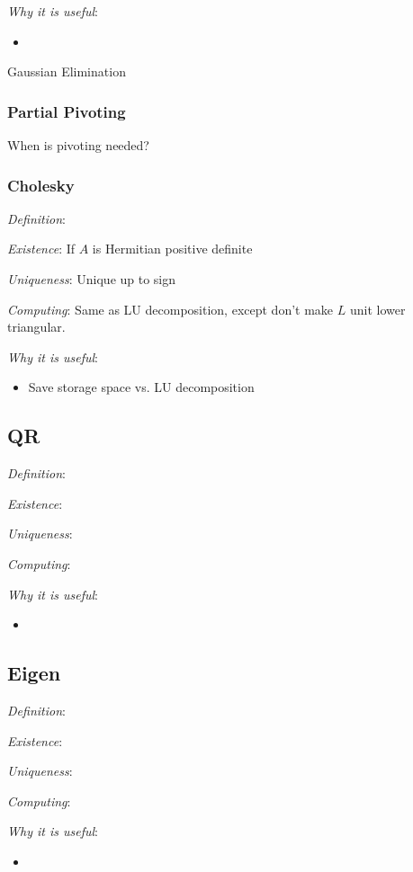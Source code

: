 \documentclass[12pt]{article}
\begin{document}
\textit{Why it is useful}:
\begin{itemize}[nolistsep]
    \item 
\end{itemize}

Gaussian Elimination 

\subsubsection{Partial Pivoting}

When is pivoting needed?

\subsubsection{Cholesky}
\label{sec:cholesky}
\textit{Definition}:

\textit{Existence}: If \( A \) is Hermitian positive definite

\textit{Uniqueness}: Unique up to sign

\textit{Computing}: Same as LU decomposition, except don't make \( L \) unit lower triangular.

\textit{Why it is useful}:
\begin{itemize}[nolistsep]
    \item Save storage space vs. LU decomposition
\end{itemize}

\subsection{QR}
\textit{Definition}:

\textit{Existence}:

\textit{Uniqueness}:

\textit{Computing}:

\textit{Why it is useful}:
\begin{itemize}[nolistsep]
    \item 
\end{itemize}



\subsection{Eigen}
\textit{Definition}:

\textit{Existence}:

\textit{Uniqueness}:

\textit{Computing}:

\textit{Why it is useful}:
\begin{itemize}[nolistsep]
    \item 
\end{itemize}
\end{document}
